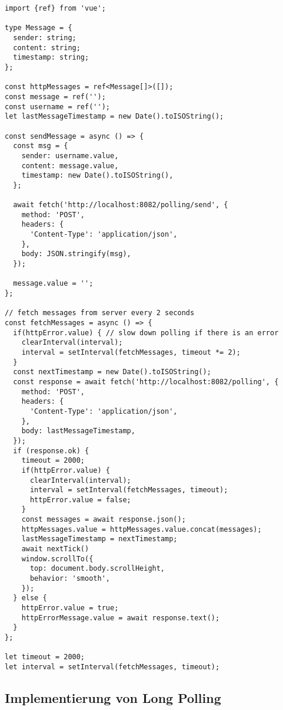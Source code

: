\documentclass[sigplan, screen]{acmart}
\begin{document}

\begin{lstlisting}[caption={Polling Client}, label={lst:polling-client}]
import {ref} from 'vue';

type Message = {
  sender: string;
  content: string;
  timestamp: string;
};

const httpMessages = ref<Message[]>([]);
const message = ref('');
const username = ref('');
let lastMessageTimestamp = new Date().toISOString();

const sendMessage = async () => {
  const msg = {
    sender: username.value,
    content: message.value,
    timestamp: new Date().toISOString(),
  };
    
  await fetch('http://localhost:8082/polling/send', {
    method: 'POST',
    headers: {
      'Content-Type': 'application/json',
    },
    body: JSON.stringify(msg),
  });

  message.value = '';
};

// fetch messages from server every 2 seconds
const fetchMessages = async () => {
  if(httpError.value) { // slow down polling if there is an error
    clearInterval(interval);
    interval = setInterval(fetchMessages, timeout *= 2);
  }
  const nextTimestamp = new Date().toISOString();
  const response = await fetch('http://localhost:8082/polling', {
    method: 'POST',
    headers: {
      'Content-Type': 'application/json',
    },
    body: lastMessageTimestamp,
  });
  if (response.ok) {
    timeout = 2000;
    if(httpError.value) {
      clearInterval(interval);
      interval = setInterval(fetchMessages, timeout);
      httpError.value = false;
    }
    const messages = await response.json();
    httpMessages.value = httpMessages.value.concat(messages);
    lastMessageTimestamp = nextTimestamp;
    await nextTick()
    window.scrollTo({
      top: document.body.scrollHeight,
      behavior: 'smooth',
    });
  } else {
    httpError.value = true;
    httpErrorMessage.value = await response.text();
  }
};

let timeout = 2000;
let interval = setInterval(fetchMessages, timeout);
\end{lstlisting}



\subsection{Implementierung von Long Polling}
\end{document}
